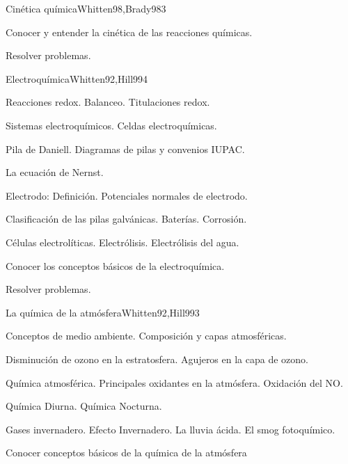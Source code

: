 \begin{syllabus}
\begin{unit}{Cinética química}{Whitten98,Brady98}{3}
   \begin{learningoutcomes}
      \item Conocer y entender la cinética de las reacciones químicas.
      \item Resolver problemas.
   \end{learningoutcomes}
\end{unit}

\begin{unit}{Electroquímica}{Whitten92,Hill99}{4}
\begin{topics}
      \item Reacciones redox. Balanceo. Titulaciones redox.
      \item Sistemas electroquímicos. Celdas electroquímicas.
      \item Pila de Daniell. Diagramas de pilas y convenios IUPAC.
      \item La ecuación de Nernst.
      \item Electrodo: Definición. Potenciales normales de electrodo.
      \item Clasificación de las pilas galvánicas. Baterías. Corrosión.
      \item Células electrolíticas. Electrólisis. Electrólisis del agua.
   \end{topics}

   \begin{learningoutcomes}
      \item Conocer los conceptos básicos de la electroquímica.
      \item Resolver problemas.
   \end{learningoutcomes}
\end{unit}

\begin{unit}{La química de la atmósfera}{Whitten92,Hill99}{3}
\begin{topics}
      \item Conceptos de medio ambiente. Composición y capas atmosféricas.
      \item Disminución de ozono en la estratosfera. Agujeros en la capa de ozono.
      \item Química atmosférica. Principales oxidantes en la atmósfera. Oxidación del NO.
      \item Química Diurna. Química Nocturna.
      \item Gases invernadero. Efecto Invernadero. La lluvia ácida. El smog fotoquímico.
    \end{topics}

   \begin{learningoutcomes}
      \item Conocer conceptos básicos de la química de la atmósfera
   \end{learningoutcomes}
\end{unit}

\begin{coursebibliography}
\end{coursebibliography}
\end{syllabus}
